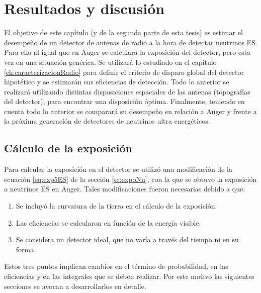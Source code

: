 \chapter{Resultados y discusi\'on}
\label{ch:resultadosRadio}

El objetivo de este cap\'itulo (y de la segunda parte de esta tesis) es estimar el desempe\~no  de un detector de antenas de radio a la hora de detectar neutrinos ES.
Para ello al igual que en Auger se calcular\'a la exposici\'on del detector, pero esta vez en una situaci\'on gen\'erica.
Se utilizar\'a lo estudiado en el capitulo \ref{ch:caracterizacionRadio} para definir el criterio de disparo global del detector hipot\'etico y se estimar\'an sus eficiencias de detecci\'on.
Todo lo anterior se realizar\'a utilizando distintas disposiciones espaciales de las antenas (topograf\'ias del detector), para encontrar una disposici\'on \'optima.
Finalmente, teniendo en cuenta todo lo anterior se comparar\'a su desempe\~no en relaci\'on a Auger y frente a la pr\'oxima generaci\'on de detectores de neutrinos ultra energ\'eticos.

\section{C\'alculo de la exposici\'on}
	
	Para calcular la exposici\'on en el detector se utiliz\'o una modificaci\'on de la ecuaci\'on \ref{eq:exp5ES} de la secci\'on \ref{sc:expoNu}, con la que se obtuvo la exposici\'on a neutrinos ES en Auger.
	Tales modificaciones fueron necesarias debido a que:
	\begin{enumerate}
	 \item Se incluy\'o la curvatura de la tierra en el c\'alculo de la exposici\'on.
	 \item Las eficiencias se calcularon en funci\'on de la energ\'ia visible.
	 \item Se considera un detector ideal, que no var\'ia a trav\'es del tiempo ni en su forma.
	\end{enumerate}
	Estos tres puntos implican cambios en el t\'ermino de probabilidad, en las eficiencias y en las integrales que se deben realizar.
	Por este motivo las siguientes secciones se avocan a desarrollarlos en detalle.
	

